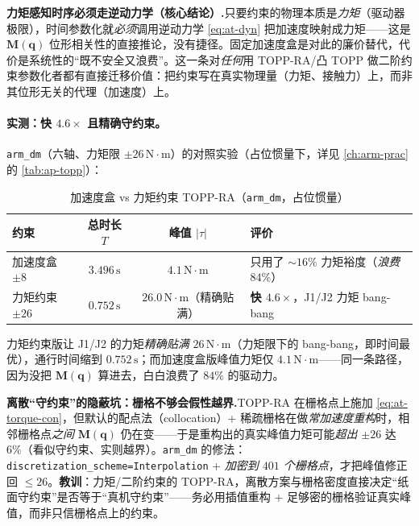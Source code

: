 \begin{insight}
\textbf{力矩感知时序必须走逆动力学（核心结论）.}\;只要约束的物理本质是\emph{力矩}（驱动器极限），时间参数化就\emph{必须}调用逆动力学 \cref{eq:at-dyn} 把加速度映射成力矩——这是 $\mathbf{M}(\mathbf{q})$ 位形相关性的直接推论，没有捷径。固定加速度盒是对此的廉价替代，代价是系统性的“既不安全又浪费”。这一条对\emph{任何}用 TOPP-RA/凸 TOPP 做二阶约束参数化者都有直接迁移价值：把约束写在真实物理量（力矩、接触力）上，而非其位形无关的代理（加速度）上。
\end{insight}

\paragraph{实测：快 $4.6\times$ 且精确守约束。}
\texttt{arm\_dm}（六轴、力矩限 $\pm 26\,\mathrm{N\!\cdot\! m}$）的对照实验（占位惯量下，详见 \cref{ch:arm-prac} 的 \cref{tab:ap-topp}）：

\begin{table}[H]\centering\small
\caption{加速度盒 vs 力矩约束 TOPP-RA（\texttt{arm\_dm}，占位惯量）}
\label{tab:at-torque-cmp}
\begin{tabular}{p{} c c p{}}
\toprule
约束 & 总时长 $T$ & 峰值 $|\tau|$ & 评价 \\
\midrule
加速度盒 $\pm 8$ & $3.496\,\mathrm{s}$ & $4.1\,\mathrm{N\!\cdot\! m}$ & 只用了 $\sim 16\%$ 力矩裕度（\emph{浪费} $84\%$） \\
力矩约束 $\pm 26$ & $0.752\,\mathrm{s}$ & $26.0\,\mathrm{N\!\cdot\! m}$（精确贴满） & \textbf{快 $4.6\times$}，J1/J2 力矩 bang-bang \\
\bottomrule
\end{tabular}
\end{table}

力矩约束版让 J1/J2 的力矩\emph{精确贴满} $26\,\mathrm{N\!\cdot\! m}$（力矩限下的 bang-bang，即时间最优），通行时间缩到 $0.752\,\mathrm{s}$；而加速度盒版峰值力矩仅 $4.1\,\mathrm{N\!\cdot\! m}$——同一条路径，因为没把 $\mathbf{M}(\mathbf{q})$ 算进去，白白浪费了 $84\%$ 的驱动力。

\begin{pitfall}
\textbf{离散“守约束”的隐蔽坑：栅格不够会假性越界.}\;TOPP-RA 在栅格点上施加 \cref{eq:at-torque-con}，但默认的配点法（collocation）+ 稀疏栅格在做\emph{常加速度重构}时，相邻栅格点\emph{之间} $\mathbf{M}(\mathbf{q})$ 仍在变——于是重构出的真实峰值力矩可能\emph{超出} $\pm 26$ 达 $6\%$（看似守约束、实则越界）。\texttt{arm\_dm} 的修法：\texttt{discretization\_scheme=Interpolation} + \emph{加密到 $401$ 个栅格点}，才把峰值修正回 $\le 26$。\textbf{教训}：力矩/二阶约束的 TOPP-RA，离散方案与栅格密度直接决定“纸面守约束”是否等于“真机守约束”——务必用插值重构 + 足够密的栅格验证真实峰值，而非只信栅格点上的约束。
\end{pitfall}

